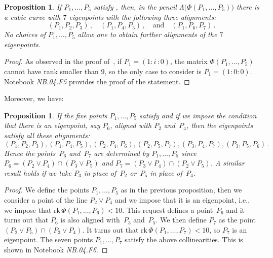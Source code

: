 \documentclass[a4paper, 11pt, reqno]{amsart}
\theoremstyle{plain}
\newtheorem{prop}[lemma]{Proposition}
\theoremstyle{definition}
\newcommand{\nb}[2]{\textsl{{NB}.{#1}.{#2}}}
\newcommand{\iii}{\textit{i}\,}
\newcommand{\rk}{\ensuremath{\mathrm{rk}}}
\begin{document}
\begin{prop}
\label{proposition:three_d_three_alignments}
If $P_1, \dots, P_5$ satisfy ,
then, in the pencil $\Lambda \bigl( \Phi(P_1, \dotsc, P_5)\bigr)$ there is
a cubic curve with $7$ eigenpoints with the following three alignments:
%
\[
 (P_1, P_2, P_3) \,, \quad (P_1, P_4, P_5) \,, \quad \text{and} \quad (P_1, P_6, P_7) \,.
\]
%
No choices of $P_1, \dots, P_5$ allow one to obtain further alignments of the $7$ eigenpoints.
\end{prop}
%
\begin{proof}
As observed in the proof of~, if $P_1 = (1: \iii: 0)$,
the matrix
$\Phi(P_1, \dots, P_5)$ cannot have rank smaller than $9$, so the only
case to consider is $P_1 = (1: 0: 0)$.
Notebook \nb{04}{F5} provides the proof of the statement.
\end{proof}
%
Moreover, we have:
%
\begin{prop}
\label{proposition:d2_6align}
If the five points $P_1, \dots, P_5$ satisfy 
and if we impose the condition that there is an eigenpoint, say $P_6$, aligned with $P_2$ and~$P_4$, then the eigenpoints satisfy all these
alignments:
%
\[
  (P_1, P_2, P_3), (P_1, P_4, P_5),
  (P_2, P_4, P_6), (P_2, P_5, P_7),
  (P_3, P_4, P_7), (P_3, P_5, P_6) \,.
\]
%
Hence the points~$P_6$ and~$P_7$ are determined by $P_1, \dots, P_5$
since
$P_6 = (P_2 \vee P_4) \cap (P_3 \vee P_5)$
and $P_7 = (P_3 \vee P_4) \cap (P_2 \vee P_5)$.
A similar result holds if we take $P_3$ in place of~$P_2$ or~$P_5$
in place of~$P_4$.
\end{prop}
%
\begin{proof}
We define the points $P_1, \dots, P_5$ as in the previous proposition, then
we consider a point of the line $P_2 \vee P_4$ and we impose that it is
an eigenpoint, i.e., we impose that $\rk \, \Phi(P_1, \dotsc, P_6) < 10$.
This request defines a point~$P_6$ and it turns out that $P_6$ is also aligned
with~$P_3$ and~$P_5$. We then define $P_7$ as the point
$(P_2 \vee P_5) \cap (P_3 \vee P_4)$. It turns out that
$\rk \, \Phi(P_1, \dots, P_7) < 10$, so $P_7$ is an eigenpoint. The seven
points $P_1, \dotsc, P_7$ satisfy the above collinearities.
This is shown in Notebook \nb{04}{F6}.
\end{proof}
\end{document}
